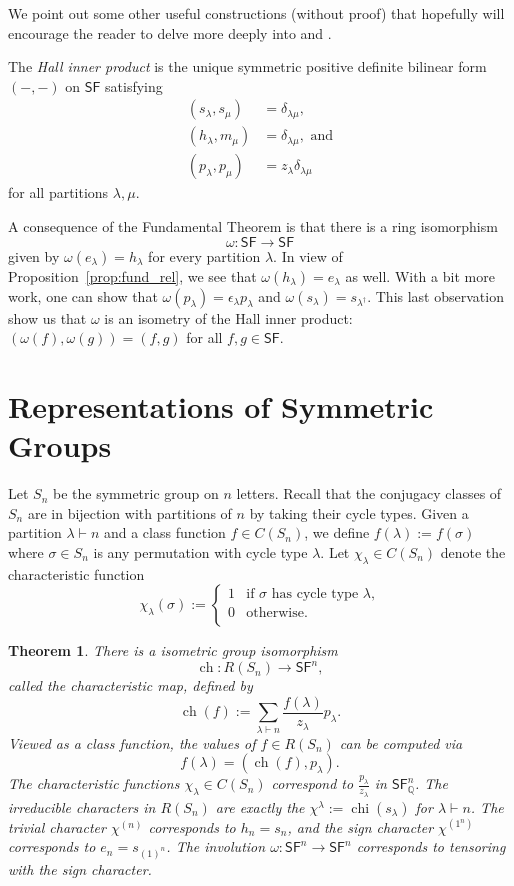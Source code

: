 \documentclass[12pt]{article}
\theoremstyle{plain}
\newtheorem{theorem}{Theorem}[section]
\theoremstyle{definition}
\theoremstyle{remark}
\numberwithin{equation}{section}
\begin{document}
We point out some other useful constructions (without proof)
that hopefully will encourage the reader to
delve more deeply into \cite{Macdonald} and \cite{Stanley2}.

The \emph{Hall inner product} is the unique
symmetric positive definite bilinear form $(-,-)$ on $\mathsf{SF}$
satisfying
\begin{align*}
( s_\lambda, s_\mu ) &= \delta_{\lambda \mu},\\
( h_\lambda, m_\mu ) &= \delta_{\lambda \mu}, \textrm{ and}\\
( p_\lambda, p_\mu ) &= z_\lambda \delta_{\lambda \mu}
\end{align*}
for all partitions $\lambda, \mu$.

A consequence of the Fundamental Theorem is that there is a ring
isomorphism
\[
\omega : \mathsf{SF} \to \mathsf{SF}
\]
given by $\omega(e_\lambda)=h_\lambda$ for every partition $\lambda$.
In view of Proposition~\ref{prop:fund_rel}, we see that
$\omega(h_\lambda)=e_\lambda$ as well.
With a bit more work, one can show that
$\omega(p_\lambda)=\epsilon_\lambda p_\lambda$
and
$\omega(s_\lambda)=s_{\lambda^\dag}$.
This last observation show us that $\omega$ is an isometry
of the Hall inner product:
$( \omega(f), \omega(g) ) = (f, g)$ for
all $f,g \in \mathsf{SF}$.

\section{Representations of Symmetric Groups}

Let $S_n$ be the symmetric group on $n$ letters.
Recall that the conjugacy classes of $S_n$ are in bijection with
partitions of $n$ by taking their cycle types.
Given a partition $\lambda \vdash n$ and a class function
$f \in C(S_n)$, we define $f(\lambda):=f(\sigma)$ where
$\sigma \in S_n$ is any permutation with cycle type $\lambda$.
Let $\chi_\lambda \in C(S_n)$ denote the characteristic function
\[
\chi_\lambda(\sigma) :=
\begin{cases}
1 & \textrm{if $\sigma$ has cycle type $\lambda$,}\\
0 & \textrm{otherwise.}\\
\end{cases}
\]

\begin{theorem}
There is a isometric group isomorphism
\[
\operatorname{ch} : R(S_n) \to \mathsf{SF}^n,
\]
called the \emph{characteristic map}, defined by
\[
\operatorname{ch}(f) :=
\sum_{\lambda \vdash n} \frac{f(\lambda)}{z_\lambda} p_{\lambda}.
\]
Viewed as a class function, the values of $f \in R(S_n)$
can be computed via
\[
f(\lambda) = ( \operatorname{ch}(f), p_\lambda ).
\]
The characteristic functions $\chi_\lambda \in C(S_n)$
correspond to $\frac{p_{\lambda}}{z_\lambda}$ in
$\mathsf{SF}^n_{\mathbb{Q}}$.
The irreducible characters in $R(S_n)$ are
exactly the $\chi^\lambda := \operatorname{chi}(s_\lambda)$
for $\lambda \vdash n$.
The trivial character $\chi^{(n)}$ corresponds to $h_n=s_n$, and
the sign character $\chi^{(1^n)}$ corresponds to $e_n=s_{(1)^n}$.
The involution $\omega : \mathsf{SF}^n \to \mathsf{SF}^n$
corresponds to tensoring with the sign character.
\end{theorem}
\end{document}

